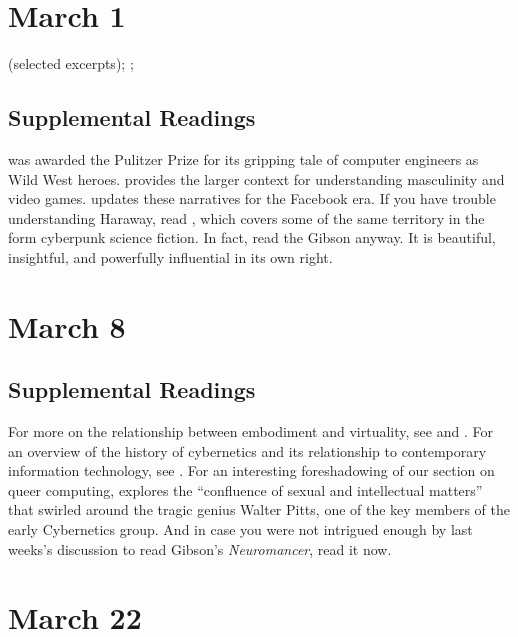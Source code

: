 \documentclass[11pt]{article}
\begin{document}
\section{March 1}
\label{sec:org772020a}

 (selected excerpts); 
; 

\subsection{Supplemental Readings}
\label{sec:org1d0b33c}

\cite{Kidder:1981tj} was awarded the Pulitzer Prize for its gripping
tale of computer engineers as Wild West heroes. \cite{Kocurek:2015cg}
provides the larger context for understanding masculinity and video
games. \cite{Losse:2012um} updates these narratives for the Facebook
era. If you have trouble understanding Haraway, read
\cite{Gibson:1995un}, which covers some of the same territory in the
form cyberpunk science fiction. In fact, read the Gibson anyway. It is
beautiful, insightful, and powerfully influential in its own right.

\section{March 8}
\label{sec:org8c716e9}


\subsection{Supplemental Readings}
\label{sec:org8efb12c}

For more on the relationship between embodiment and virtuality, see \cite{Stone:1996wp} and \cite{Balsamo:1996uc}.  For an overview of the history of cybernetics and its relationship to contemporary information technology, see \cite{Kline:2015ti}.  For an interesting foreshadowing of our section on queer computing, \cite{Wilson:2009wm} explores the ``confluence of sexual and intellectual matters'' that swirled around the tragic genius Walter Pitts, one of the key members of the early Cybernetics group. And in case you were not intrigued enough by last weeks's discussion to read Gibson's \emph{Neuromancer}, read it now.

\section{March 22}
\label{sec:orgac6809d}
\end{document}
